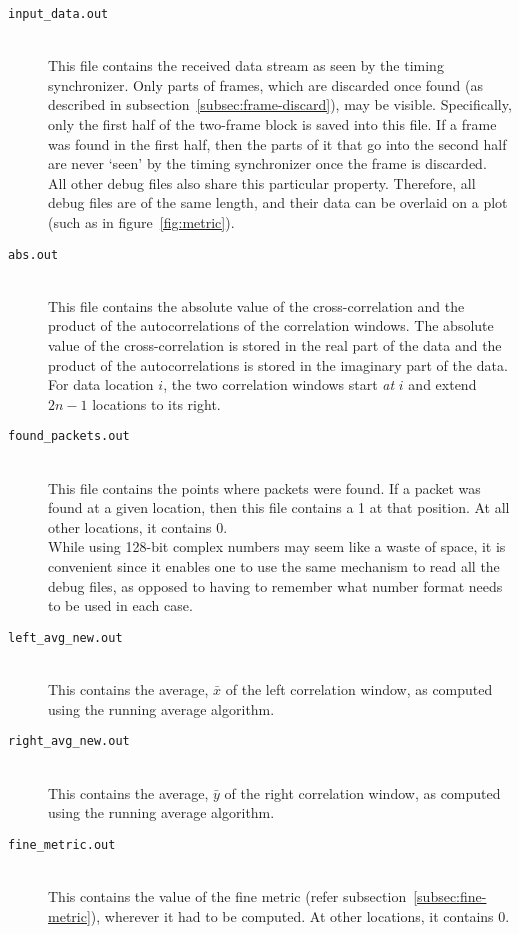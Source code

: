 \begin{description}
	\item[\texttt{input\_data.out}] \hfill \\
		This file contains the received data stream as seen by the timing
		synchronizer. Only parts of frames, which are discarded once found (as
		described in subsection~\ref{subsec:frame-discard}), may be visible.
		Specifically, only the first half of the two-frame block is saved into
		this file. If a frame was found in the first half, then the parts of it
		that go into the second half are never `seen' by the timing
		synchronizer once the frame is discarded. \\
		All other debug files also share this particular property. Therefore,
		all debug files are of the same length, and their data can be overlaid
		on a plot (such as in figure~\ref{fig:metric}).
	\item[\texttt{abs.out}] \hfill \\
		This file contains the absolute value of the cross-correlation and the
		product of the autocorrelations of the correlation windows. The
		absolute value of the cross-correlation is stored in the real part of
		the data and the product of the autocorrelations is stored in the
		imaginary part of the data. For data location $i$, the two correlation
		windows start \emph{at} $i$ and extend $2n-1$ locations to its right.
	\item[\texttt{found\_packets.out}] \hfill \\
		This file contains the points where packets were found. If a packet
		was found at a given location, then this file contains a 1 at that
		position. At all other locations, it contains 0. \\
		While using 128-bit complex numbers may seem like a waste of space, it
		is convenient since it enables one to use the same mechanism to read
		all the debug files, as opposed to having to remember what number
		format needs to be used in each case.
	\item[\texttt{left\_avg\_new.out}] \hfill \\
		This contains the average, $\bar{x}$ of the left correlation window, as
		computed using the running average algorithm.
	\item[\texttt{right\_avg\_new.out}] \hfill \\
		This contains the average, $\bar{y}$ of the right correlation window,
		as computed using the running average algorithm.
	\item[\texttt{fine\_metric.out}] \hfill \\
		This contains the value of the fine metric (refer
		subsection~\ref{subsec:fine-metric}), wherever it had to be computed.
		At other locations, it contains 0.
\end{description}

